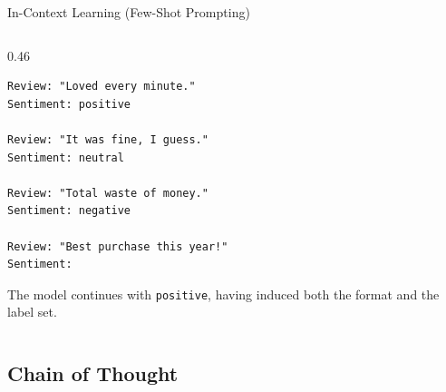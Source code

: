 \begin{frame}[fragile]{In-Context Learning (Few-Shot Prompting)}
\begin{columns}
\begin{column}{0.46\textwidth}
\begin{lstlisting}
Review: "Loved every minute."
Sentiment: positive

Review: "It was fine, I guess."
Sentiment: neutral

Review: "Total waste of money."
Sentiment: negative

Review: "Best purchase this year!"
Sentiment:
\end{lstlisting}
      \vspace{0.2em}
      {\scriptsize The model continues with \texttt{positive}, having induced both the format and the label set.}
    \end{column}
  \end{columns}
\end{frame}

\subsection{Chain of Thought}

